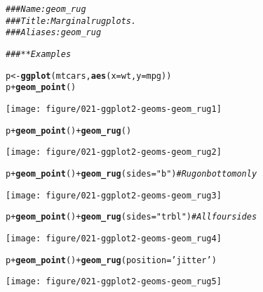 \documentclass[a4paper,titlepage]{tufte-handout}\usepackage[]{graphicx}\usepackage[]{color}
\makeatletter
\def\maxwidth{ %
  \ifdim\Gin@nat@width>\linewidth
    \linewidth
  \else
    \Gin@nat@width
  \fi
}
\newcommand{\hlstr}[1]{\textcolor[rgb]{0.192,0.494,0.8}{#1}}%
\newcommand{\hlcom}[1]{\textcolor[rgb]{0.678,0.584,0.686}{\textit{#1}}}%
\newcommand{\hlopt}[1]{\textcolor[rgb]{0,0,0}{#1}}%
\newcommand{\hlstd}[1]{\textcolor[rgb]{0.345,0.345,0.345}{#1}}%
\newcommand{\hlkwb}[1]{\textcolor[rgb]{0.69,0.353,0.396}{#1}}%
\newcommand{\hlkwc}[1]{\textcolor[rgb]{0.333,0.667,0.333}{#1}}%
\newcommand{\hlkwd}[1]{\textcolor[rgb]{0.737,0.353,0.396}{\textbf{#1}}}%
\newenvironment{kframe}{%
 \def\at@end@of@kframe{}%
 \ifinner\ifhmode%
  \def\at@end@of@kframe{\end{minipage}}%
  \begin{minipage}{\columnwidth}%
 \fi\fi%
 \def\FrameCommand##1{\hskip\@totalleftmargin \hskip-\fboxsep
 \colorbox{shadecolor}{##1}\hskip-\fboxsep
     \hskip-\linewidth \hskip-\@totalleftmargin \hskip\columnwidth}%
 \MakeFramed {\advance\hsize-\width
   \@totalleftmargin\z@ \linewidth\hsize
   \@setminipage}}%
 {\par\unskip\endMakeFramed%
 \at@end@of@kframe}
\newenvironment{knitrout}{}{} %
\makeatother
\begin{document}
\begin{knitrout}
\color{fgcolor}\begin{kframe}
\begin{alltt}
\hlcom{### Name: geom_rug}
\hlcom{### Title: Marginal rug plots.}
\hlcom{### Aliases: geom_rug}

\hlcom{### ** Examples}

\hlstd{p} \hlkwb{<-} \hlkwd{ggplot}\hlstd{(mtcars,} \hlkwd{aes}\hlstd{(}\hlkwc{x}\hlstd{=wt,} \hlkwc{y}\hlstd{=mpg))}
\hlstd{p} \hlopt{+} \hlkwd{geom_point}\hlstd{()}
\end{alltt}
\end{kframe}
\texttt{[image: figure/021-ggplot2-geoms-geom\_rug1]} 
\begin{kframe}\begin{alltt}
\hlstd{p} \hlopt{+} \hlkwd{geom_point}\hlstd{()} \hlopt{+} \hlkwd{geom_rug}\hlstd{()}
\end{alltt}
\end{kframe}
\texttt{[image: figure/021-ggplot2-geoms-geom\_rug2]} 
\begin{kframe}\begin{alltt}
\hlstd{p} \hlopt{+} \hlkwd{geom_point}\hlstd{()} \hlopt{+} \hlkwd{geom_rug}\hlstd{(}\hlkwc{sides}\hlstd{=}\hlstr{"b"}\hlstd{)}    \hlcom{# Rug on bottom only}
\end{alltt}
\end{kframe}
\texttt{[image: figure/021-ggplot2-geoms-geom\_rug3]} 
\begin{kframe}\begin{alltt}
\hlstd{p} \hlopt{+} \hlkwd{geom_point}\hlstd{()} \hlopt{+} \hlkwd{geom_rug}\hlstd{(}\hlkwc{sides}\hlstd{=}\hlstr{"trbl"}\hlstd{)} \hlcom{# All four sides}
\end{alltt}
\end{kframe}
\texttt{[image: figure/021-ggplot2-geoms-geom\_rug4]} 
\begin{kframe}\begin{alltt}
\hlstd{p} \hlopt{+} \hlkwd{geom_point}\hlstd{()} \hlopt{+} \hlkwd{geom_rug}\hlstd{(}\hlkwc{position}\hlstd{=}\hlstr{'jitter'}\hlstd{)}
\end{alltt}
\end{kframe}
\texttt{[image: figure/021-ggplot2-geoms-geom\_rug5]} 
\begin{kframe}\begin{alltt}


\end{alltt}
\end{kframe}
\end{knitrout}
\end{document}
